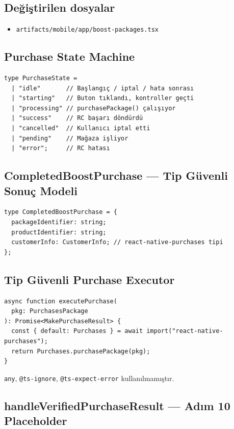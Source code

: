 \documentclass[12pt,a4paper]{article}
\begin{document}
\subsection{Değiştirilen dosyalar}

\begin{itemize}[leftmargin=1.5em]
  \item \texttt{artifacts/mobile/app/boost-packages.tsx}
\end{itemize}

\subsection{Purchase State Machine}

\begin{lstlisting}[language={}]
type PurchaseState =
  | "idle"       // Başlangıç / iptal / hata sonrası
  | "starting"   // Buton tıklandı, kontroller geçti
  | "processing" // purchasePackage() çalışıyor
  | "success"    // RC başarı döndürdü
  | "cancelled"  // Kullanıcı iptal etti
  | "pending"    // Mağaza işliyor
  | "error";     // RC hatası
\end{lstlisting}

\subsection{CompletedBoostPurchase — Tip Güvenli Sonuç Modeli}

\begin{lstlisting}[language={}]
type CompletedBoostPurchase = {
  packageIdentifier: string;
  productIdentifier: string;
  customerInfo: CustomerInfo; // react-native-purchases tipi
};
\end{lstlisting}

\subsection{Tip Güvenli Purchase Executor}

\begin{lstlisting}[language={}]
async function executePurchase(
  pkg: PurchasesPackage
): Promise<MakePurchaseResult> {
  const { default: Purchases } = await import("react-native-purchases");
  return Purchases.purchasePackage(pkg);
}
\end{lstlisting}

\texttt{any}, \texttt{@ts-ignore}, \texttt{@ts-expect-error} kullanılmamıştır.

\subsection{handleVerifiedPurchaseResult — Adım 10 Placeholder}
\end{document}

